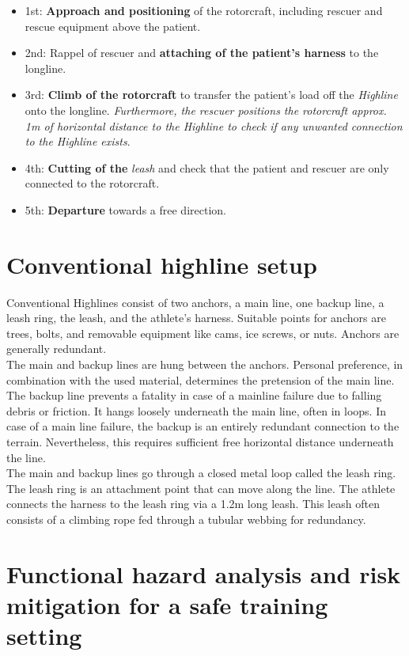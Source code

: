 \documentclass[a4paper,10pt]{scrartcl}
\begin{document}
\begin{itemize}
\item  1st: \textbf{Approach and positioning} of the rotorcraft, including rescuer and rescue equipment above the patient.
\item  2nd: Rappel of rescuer and \textbf{attaching of the patient's harness} to the longline.
\item 3rd: \textbf{Climb of the rotorcraft} to transfer the patient's load off the \textit{Highline} onto the longline. \textit{Furthermore, the rescuer positions the rotorcraft approx. 1m of horizontal distance to the Highline to check if any unwanted connection to the Highline exists}.
\item 4th: \textbf{Cutting of the} \textit{leash} and check that the patient and rescuer are only connected to the rotorcraft.
\item 5th: \textbf{Departure} towards a free direction.
\end{itemize}

\section{Conventional highline setup}
\label{sec:conventional}

Conventional Highlines consist of two anchors, a main line, one backup line, a leash ring, the leash, and the athlete's harness. Suitable points for anchors are trees, bolts, and removable equipment like cams, ice screws, or nuts. Anchors are generally redundant. \\
The main and backup lines are hung between the anchors. Personal preference, in combination with the used material, determines the pretension of the main line. The backup line prevents a fatality in case of a mainline failure due to falling debris or friction. It hangs loosely underneath the main line, often in loops. In case of a main line failure, the backup is an entirely redundant connection to the terrain. Nevertheless, this requires sufficient free horizontal distance underneath the line. \\
The main and backup lines go through a closed metal loop called the leash ring. The leash ring is an attachment point that can move along the line. The athlete connects the harness to the leash ring via a 1.2m long leash. This leash often consists of a climbing rope fed through a tubular webbing for redundancy.

\section{Functional hazard analysis and risk mitigation for a safe training setting}
\label{sec:fha}
\end{document}
